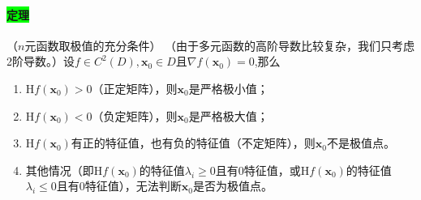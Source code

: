 \documentclass[UTF8]{ctexart}
\newcommand{\x}{\boldsymbol{x}}
\begin{document}
    \paragraph{\colorbox{lime}{定理}}（$n$元函数取极值的充分条件） （由于多元函数的高阶导数比较复杂，我们只考虑2阶导数。）设$f\in C^2(D),\boldsymbol{x}_0\in D$且$\nabla f(\boldsymbol{x}_0)=0$,那么
    \begin{enumerate}[1)]
        \item $\mathrm{H}f(\boldsymbol{x}_0)>0$（正定矩阵），则$\boldsymbol{x}_0$是严格极小值；
        \item $\mathrm{H}f(\boldsymbol{x}_0)<0$（负定矩阵），则$\boldsymbol{x}_0$是严格极大值；
        \item $\mathrm{H}f(\boldsymbol{x}_0)$有正的特征值，也有负的特征值（不定矩阵），则$\x_0$不是极值点。
        \item 其他情况（即$\mathrm{H}f(\x_0)$的特征值$\lambda_i\ge 0$且有$0$特征值，或$\mathrm{H}f(\x_0)$的特征值$\lambda_i\le 0$且有$0$特征值），无法判断$\x_0$是否为极值点。
    \end{enumerate}
\end{document}
